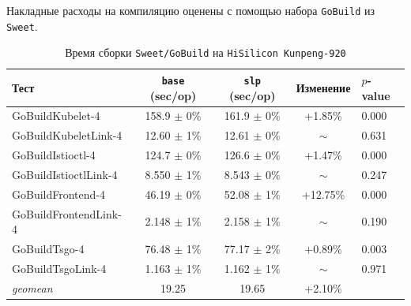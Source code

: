 Накладные расходы на компиляцию оценены с помощью набора \texttt{GoBuild} из \texttt{Sweet}.

\begin{table}[htbp]
    \centering
    \caption{Время сборки \texttt{Sweet/GoBuild} на  \texttt{HiSilicon Kunpeng-920}}
    \small
    \begin{tabular}{lcccl}
        \hline
        Тест & \texttt{base} (sec/op) & \texttt{slp} (sec/op) & Изменение & $p$-value \\
        \hline
        GoBuildKubelet-4       & 158.9 $\pm$ 0\% & 161.9 $\pm$ 0\% & +1.85\%  & 0.000 \\
        GoBuildKubeletLink-4   & 12.60 $\pm$ 1\% & 12.61 $\pm$ 0\% & $\sim$   & 0.631 \\
        GoBuildIstioctl-4      & 124.7 $\pm$ 0\% & 126.6 $\pm$ 0\% & +1.47\%  & 0.000 \\
        GoBuildIstioctlLink-4  & 8.550 $\pm$ 1\% & 8.543 $\pm$ 0\% & $\sim$   & 0.247 \\
        GoBuildFrontend-4      & 46.19 $\pm$ 0\% & 52.08 $\pm$ 1\% & +12.75\% & 0.000 \\
        GoBuildFrontendLink-4  & 2.148 $\pm$ 1\% & 2.158 $\pm$ 1\% & $\sim$   & 0.190 \\
        GoBuildTsgo-4          & 76.48 $\pm$ 1\% & 77.17 $\pm$ 2\% & +0.89\%  & 0.003 \\
        GoBuildTsgoLink-4      & 1.163 $\pm$ 1\% & 1.162 $\pm$ 1\% & $\sim$   & 0.971 \\
        \hline
        \textit{geomean}       & 19.25           & 19.65           & +2.10\%  & \\
        \hline
    \end{tabular}
\end{table}

